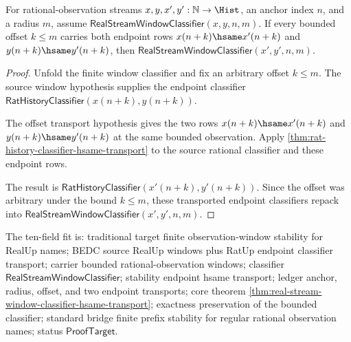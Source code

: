 \begin{theorem}
\label{thm:real-stream-window-classifier-hsame-transport}
For rational-observation streams $x,y,x',y':\mathbb{N}\to\Hist$, an anchor
index $n$, and a radius $m$, assume
$\mathsf{RealStreamWindowClassifier}(x,y,n,m)$. If every bounded offset
$k\le m$ carries both endpoint rows
$x(n+k)\hsame x'(n+k)$ and $y(n+k)\hsame y'(n+k)$, then
$\mathsf{RealStreamWindowClassifier}(x',y',n,m)$.
\end{theorem}
\begin{proof}
Unfold the finite window classifier and fix an arbitrary offset $k\le m$. The
source window hypothesis supplies the endpoint classifier
$\mathsf{RatHistoryClassifier}(x(n+k),y(n+k))$.

The offset transport hypothesis gives the two rows
$x(n+k)\hsame x'(n+k)$ and $y(n+k)\hsame y'(n+k)$ at the same bounded
observation. Apply
\autoref{thm:rat-history-classifier-hsame-transport} to the source rational
classifier and these endpoint rows.

The result is
$\mathsf{RatHistoryClassifier}(x'(n+k),y'(n+k))$. Since the offset was
arbitrary under the bound $k\le m$, these transported endpoint classifiers
repack into $\mathsf{RealStreamWindowClassifier}(x',y',n,m)$.
\end{proof}

The ten-field fit is: traditional target finite observation-window stability
for RealUp names; BEDC source RealUp windows plus RatUp endpoint classifier
transport; carrier bounded rational-observation windows; classifier
$\mathsf{RealStreamWindowClassifier}$; stability endpoint hsame transport;
ledger anchor, radius, offset, and two endpoint transports; core theorem
\autoref{thm:real-stream-window-classifier-hsame-transport}; exactness
preservation of the bounded classifier; standard bridge finite prefix
stability for regular rational observation names; status
$\mathsf{ProofTarget}$.

